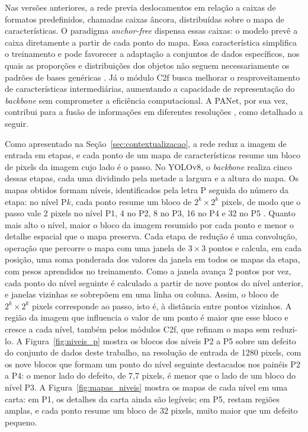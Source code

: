 \documentclass[
    12pt,                %
    openright,           %
    oneside,             %
    a4paper,             %
    english,             %
    brazil               %
]{abntex2}
\begin{document}
Nas versões anteriores, a rede previa deslocamentos em relação a caixas
de formatos predefinidos, chamadas caixas âncora, distribuídas sobre o
mapa de características. O paradigma \textit{anchor-free} dispensa essas
caixas: o modelo prevê a caixa diretamente a partir de cada ponto do mapa.
Essa característica simplifica o treinamento e pode favorecer a adaptação a
conjuntos de dados específicos, nos quais as proporções e distribuições dos objetos
não seguem necessariamente os padrões de bases genéricas \cite{Ramos2025}. Já o
módulo C2f busca melhorar o reaproveitamento de características intermediárias,
aumentando a capacidade de representação do \textit{backbone} sem comprometer a
eficiência computacional. A PANet, por sua vez, contribui para a fusão
de informações em diferentes resoluções \cite{Ramos2025}, como detalhado
a seguir.

Como apresentado na Seção~\ref{sec:contextualizacao}, a rede reduz a
imagem de entrada em etapas, e cada ponto de um mapa de características
resume um bloco de pixels da imagem cujo lado é o passo. No YOLOv8, o
\textit{backbone} realiza cinco dessas etapas, cada uma dividindo pela
metade a largura e a altura do mapa. Os mapas obtidos formam níveis,
identificados pela letra P seguida do número da etapa: no nível P$k$,
cada ponto resume um bloco de $2^k \times 2^k$ pixels, de modo que o
passo vale 2 pixels no nível P1, 4 no P2, 8 no P3, 16 no P4 e 32 no P5
\cite{Jocher2023}. Quanto mais alto o nível, maior o bloco da imagem
resumido por cada ponto e menor o detalhe espacial que o mapa preserva.
Cada etapa de redução é uma convolução, operação que percorre o mapa com
uma janela de $3 \times 3$ pontos e calcula, em cada posição, uma soma
ponderada dos valores da janela em todos os mapas da etapa, com pesos
aprendidos no treinamento. Como a janela avança 2 pontos por vez, cada
ponto do nível seguinte é calculado a partir de nove pontos do nível
anterior, e janelas vizinhas se sobrepõem em uma linha ou coluna. Assim,
o bloco de $2^k \times 2^k$ pixels corresponde ao passo, isto é, à
distância entre pontos vizinhos. A região da imagem que influencia o valor
de um ponto é maior que esse bloco e cresce a cada nível, também pelos
módulos C2f, que refinam o mapa sem reduzi-lo.
A Figura~\ref{fig:niveis_p} mostra os blocos dos níveis P2 a P5 sobre
um defeito do conjunto de dados deste trabalho, na resolução de entrada
de 1280 pixels, com os nove blocos que formam um ponto do nível seguinte
destacados nos painéis P2 a P4: o menor lado do defeito, de 7,7 pixels, é menor que o
lado de um bloco do nível P3. A Figura~\ref{fig:mapas_niveis} mostra os mapas de cada nível em uma carta: em P1, os detalhes da carta ainda são legíveis; em P5, restam regiões amplas, e cada ponto resume um bloco de 32 pixels, muito maior que um defeito pequeno.
\end{document}
